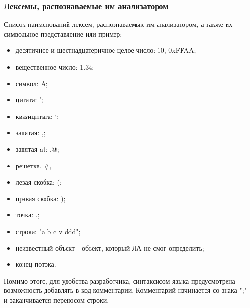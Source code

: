 \subsubsection{Лексемы, распознаваемые им анализатором}

Список наименований лексем, распознаваемых им анализатором, а также их символьное представление или пример:
\begin{itemize}
	\item десятичное и шестнадцатеричное целое число: 10, 0xFFAA;
	\item вещественное число: 1.34;
	\item символ: A;
	\item цитата: ';
	\item квазицитата: `;
	\item запятая: ,;
	\item запятая-at: ,@;
	\item решетка: \#;
	\item левая скобка: (;
	\item правая скобка: );
	\item точка: .;
	\item строка: "a b c v ddd";
	\item неизвестный объект - объект, который ЛА не смог определить;
	\item конец потока.
\end{itemize}

Помимо этого, для удобства разработчика, синтаксисом языка предусмотрена возможность добавлять в код комментарии. Комментарий начинается со знака ‭";" и заканчивается переносом строки.


